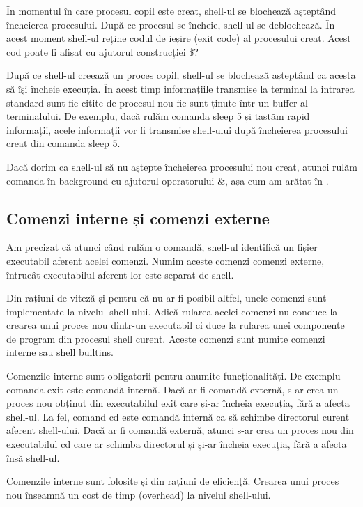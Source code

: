 În momentul în care procesul copil este creat, shell-ul se blochează așteptând
încheierea procesului. După ce procesul se încheie, shell-ul se deblochează. În
acest moment shell-ul reține codul de ieșire (exit code) al procesului creat.
Acest cod poate fi afișat cu ajutorul construcției \$?

După ce shell-ul creează un proces copil, shell-ul se blochează așteptând ca
acesta să își încheie execuția. În acest timp informațiile transmise la terminal
la intrarea standard sunt fie citite de procesul nou fie sunt ținute într-un
buffer al terminalului. De exemplu, dacă rulăm comanda sleep 5 și tastăm rapid
informații, acele informații vor fi transmise shell-ului după încheierea
procesului creat din comanda sleep 5.

Dacă dorim ca shell-ul să nu aștepte încheierea procesului nou creat, atunci
rulăm comanda în background cu ajutorul operatorului \&, așa cum am arătat în
.

\subsection{Comenzi interne și comenzi externe}
\label{sec:cli-internal-cmds}

Am precizat că atunci când rulăm o comandă, shell-ul identifică un fișier
executabil aferent acelei comenzi. Numim aceste comenzi comenzi externe,
întrucât executabilul aferent lor este separat de shell.

Din rațiuni de viteză și pentru că nu ar fi posibil altfel, unele comenzi sunt
implementate la nivelul shell-ului. Adică rularea acelei comenzi nu conduce la
crearea unui proces nou dintr-un executabil ci duce la rularea unei componente
de program din procesul shell curent. Aceste comenzi sunt numite comenzi interne
sau shell builtins.

Comenzile interne sunt obligatorii pentru anumite funcționalități. De exemplu
comanda exit este comandă internă. Dacă ar fi comandă externă, s-ar crea un
proces nou obținut din executabilul exit care și-ar încheia execuția, fără a
afecta shell-ul. La fel, comand cd este comandă internă ca să schimbe directorul
curent aferent shell-ului. Dacă ar fi comandă externă, atunci s-ar crea un
proces nou din executabilul cd care ar schimba directorul și și-ar încheia
execuția, fără a afecta însă shell-ul.

Comenzile interne sunt folosite și din rațiuni de eficiență. Crearea unui proces
nou înseamnă un cost de timp (overhead) la nivelul shell-ului.

